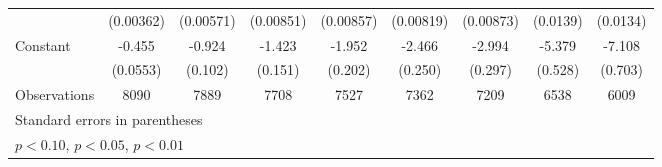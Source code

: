 \begin{table}[htbp]
\begin{tabular}{l*{8}{c}}
                    &   (0.00362)         &   (0.00571)         &   (0.00851)         &   (0.00857)         &   (0.00819)         &   (0.00873)         &    (0.0139)         &    (0.0134)         \\
[1em]
Constant            &      -0.455\sym{***}&      -0.924\sym{***}&      -1.423\sym{***}&      -1.952\sym{***}&      -2.466\sym{***}&      -2.994\sym{***}&      -5.379\sym{***}&      -7.108\sym{***}\\
                    &    (0.0553)         &     (0.102)         &     (0.151)         &     (0.202)         &     (0.250)         &     (0.297)         &     (0.528)         &     (0.703)         \\
\hline
Observations        &        8090         &        7889         &        7708         &        7527         &        7362         &        7209         &        6538         &        6009         \\
\hline\hline
\multicolumn{9}{l}{\footnotesize Standard errors in parentheses}\\
\multicolumn{9}{l}{\footnotesize \sym{*} \(p<0.10\), \sym{**} \(p<0.05\), \sym{***} \(p<0.01\)}\\
\end{tabular}
\end{table}

